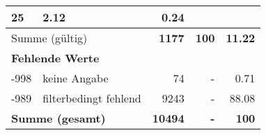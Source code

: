 \begin{longtable}{lXrrr}
       \num{25} &
       \num[round-mode=places,round-precision=2]{2,12} &
         \num[round-mode=places,round-precision=2]{0,24} \\
     \midrule
     \multicolumn{2}{l}{Summe (gültig)} &
       \textbf{\num{1177}} &
     \textbf{100} &
       \textbf{\num[round-mode=places,round-precision=2]{11,22}} \\
     \multicolumn{5}{l}{\textbf{Fehlende Werte}}\\
       -998 &
       keine Angabe &
         \num{74} &
        - &
         \num[round-mode=places,round-precision=2]{0,71} \\
       -989 &
       filterbedingt fehlend &
         \num{9243} &
        - &
         \num[round-mode=places,round-precision=2]{88,08} \\
     \midrule
     \multicolumn{2}{l}{\textbf{Summe (gesamt)}} &
          \textbf{\num{10494}} &
        \textbf{-} &
        \textbf{100} \\
     \bottomrule
     \end{longtable}
     

